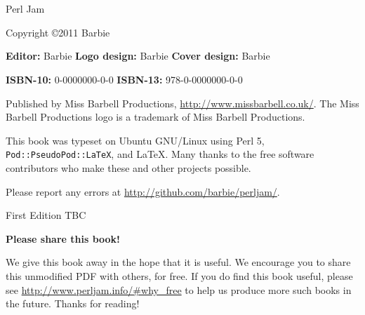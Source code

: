 \chapter*{}
\thispagestyle{empty}

\huge{Perl Jam}
\newline
\newline
\normalsize

Copyright \copyright\mbox{}2011 Barbie

\vfill
\textbf{Editor:} Barbie\newline
\textbf{Logo design:} Barbie\newline
\textbf{Cover design:} Barbie

\textbf{ISBN-10:} 0-0000000-0-0\newline
\textbf{ISBN-13:} 978-0-0000000-0-0

Published by Miss Barbell Productions, \url{http://www.missbarbell.co.uk/}.
The Miss Barbell Productions logo is a trademark of Miss Barbell Productions.

This book was typeset on Ubuntu GNU/Linux using Perl 5,
\texttt{Pod::PseudoPod::LaTeX}, and LaTeX. Many thanks to the free software
contributors who make these and other projects possible.

Please report any errors at
\url{http://github.com/barbie/perljam/}.

First Edition TBC

\pagebreak
\thispagestyle{empty}

\huge
\textbf{Please share this book!}
\newline
\newline
\normalsize

We give this book away in the hope that it is useful.  We encourage you to
share this unmodified PDF with others, for free.  If you do find this book
useful, please see \url{http://www.perljam.info/#why_free} to
help us produce more such books in the future.
\newline
Thanks for reading!
